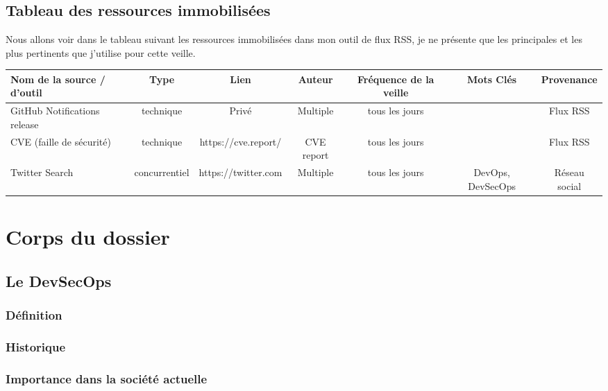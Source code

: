 \documentclass[11pt,a4paper,oneside]{book}
\begin{document}
\newpage

\begin{landscape}

\section{Tableau des ressources immobilisées}

Nous allons voir dans le tableau suivant les ressources immobilisées dans mon outil de flux RSS, je ne présente que les principales et les plus pertinents que j'utilise pour cette veille. \\

\begin{tabular}{|l|c|c|c|c|c|c|}
\hline
\rowcolor{gray!30} Nom de la source / d'outil & Type & Lien & Auteur & Fréquence de la veille & Mots Clés & Provenance \\
\hline
GitHub Notifications release & technique & Privé & Multiple & tous les jours & & Flux RSS \\
CVE (faille de sécurité) & technique & https://cve.report/ & CVE report & tous les jours & & Flux RSS \\
Twitter Search & concurrentiel & https://twitter.com & Multiple & tous les jours & DevOps, DevSecOps & Réseau social \\
\hline
\end{tabular}


\end{landscape}


\chapter{Corps du dossier}

\section{Le DevSecOps}

\subsection{Définition}

\subsection{Historique}

\subsection{Importance dans la société actuelle}
\end{document}
